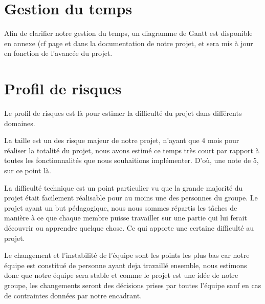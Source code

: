 \documentclass[a4paper]{memoir}
\begin{document}
		\section{Gestion du temps}
			\label{GestionTps}
			Afin de clarifier notre gestion du temps, un diagramme de Gantt est disponible en annexe (cf page \pageref{fig:Gantt} et dans la documentation de notre projet, et sera mis à jour en fonction de l'avancée du projet.\\

		\section{Profil de risques}
			Le profil de risques est là pour estimer la difficulté du projet dans différents domaines.
	
			La taille est un des risque majeur de notre projet, n'ayant que 4 mois pour réaliser la totalité du projet, nous avons estimé ce temps très court par rapport à toutes les fonctionnalités que nous souhaitions implémenter. D'où, une note de 5, sur ce point là.
			
			La difficulté technique est un point particulier vu que la grande majorité du projet était facilement réalisable pour au moins une des personnes du groupe. Le projet ayant un but pédagogique, nous nous sommes répartis les tâches de manière à ce que chaque membre puisse travailler sur une partie qui lui ferait découvrir ou apprendre quelque chose. Ce qui apporte une certaine difficulté au projet.

			Le changement et l'instabilité de l'équipe sont les points les plus bas car notre équipe est constitué de personne ayant deja travaillé ensemble, nous estimons donc que notre équipe sera stable et comme le projet est une idée de notre groupe, les changements seront des décisions prises par toutes l'équipe sauf en cas de contraintes données par notre encadrant.
\end{document}
